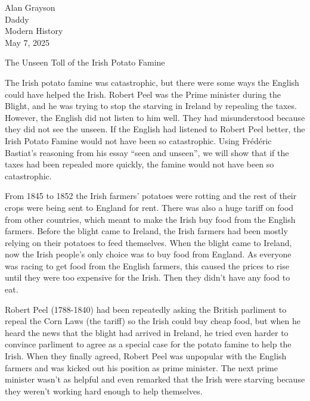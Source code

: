 \documentclass[12pt]{article}
\begin{document}
\begin{flushleft}

Alan Grayson\\
Daddy\\
Modern History\\
May 7, 2025\\


\begin{center}
The Unseen Toll of the Irish Potato Famine
\end{center}

\setlength{\parindent}{0.5in}

The Irish potato famine was catastrophic, but there were some ways the
English could have helped the Irish.  Robert Peel was the Prime
minister during the Blight, and he was trying to stop the starving in
Ireland by repealing the taxes. However, the English did not listen to
him well. They had misunderstood because they did not see the
unseen. If the English had listened to Robert Peel better, the Irish
Potato Famine would not have been so catastrophic. Using Frédéric
Bastiat's reasoning from his essay ``seen and unseen'', we will show
that if the taxes had been repealed more quickly, the famine would not
have been so catastrophic.


From 1845 to 1852 the Irish farmers' potatoes were rotting and the
rest of their crops were being sent to England for rent. There was
also a huge tariff on food from other countries, which meant to make
the Irish buy food from the English farmers. Before the
blight came to Ireland, the Irish farmers had been mostly relying on
their potatoes to feed themselves. When the blight came to Ireland,
now the Irish people's only choice was to buy food from England. As
everyone was racing to get food from the English farmers, this caused
the prices to rise until they were too expensive for the Irish. Then
they didn't have any food to eat.



Robert Peel (1788-1840) had been repeatedly asking the British
parliment to repeal the Corn Laws (the tariff) so the Irish could buy
cheap food, but when he heard the news that the blight had arrived in
Ireland, he tried even harder to convince parliment to agree as a
special case for the potato famine to help the Irish. When they
finally agreed, Robert Peel was unpopular with the English farmers and
was kicked out his position as prime minister. The next prime minister
wasn't as helpful and even remarked that the Irish were starving
because they weren't working hard enough to help themselves.




\end{flushleft}
\end{document}
